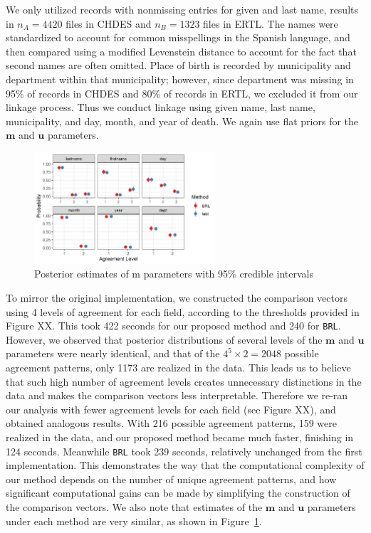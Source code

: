 \documentclass[12pt,letterpaper]{article}
\newcommand{\1}[1]{\mathbb{I}\!\left[#1\right]} %
\begin{document}
We only utilized records with nonmissing entries for given and last
name, results in \(n_A = 4420\) files in CHDES and \(n_B = 1323\) files
in ERTL. The names were standardized to account for common misspellings
in the Spanish language, and then compared using a modified Levenstein
distance to account for the fact that second names are often omitted.
Place of birth is recorded by municipality and department within that
municipality; however, since department was missing in 95\% of records
in CHDES and 80\% of records in ERTL, we excluded it from our linkage
process. Thus we conduct linkage using given name, last name,
municipality, and day, month, and year of death. We again use flat
priors for the \(\mathbf{m}\) and \(\mathbf{u}\) parameters.

\begin{figure}[t]
	
	{\centering \includegraphics[width=0.6\textwidth]{../notes/figures/el_salvador/m_posterior_smallP} 
		
	}
	
	\caption{Posterior estimates of m parameters with 95\% credible intervals}\label{fig:m-and-u}
\end{figure}

To mirror the original implementation, we constructed the comparison
vectors using 4 levels of agreement for each field, according to the
thresholds provided in Figure XX. This took 422 seconds for our proposed
method and 240 for \texttt{BRL}. However, we observed that posterior
distributions of several levels of the \(\mathbf{m}\) and \(\mathbf{u}\)
parameters were nearly identical, and that of the
\(4^5 \times 2 = 2048\) possible agreement patterns, only 1173 are
realized in the data. This leads us to believe that such high number of
agreement levels creates unnecessary distinctions in the data and makes
the comparison vectors less interpretable. Therefore we re-ran our
analysis with fewer agreement levels for each field (see Figure XX), and
obtained analogous results. With 216 possible agreement patterns, 159
were realized in the data, and our proposed method became much faster,
finishing in 124 seconds. Meanwhile \texttt{BRL} took 239 seconds,
relatively unchanged from the first implementation. This demonstrates
the way that the computational complexity of our method depends on the
number of unique agreement patterns, and how significant computational
gains can be made by simplifying the construction of the comparison
vectors. We also note that estimates of the \(\mathbf{m}\) and
\(\mathbf{u}\) parameters under each method are very similar, as shown in
Figure~\ref{fig:m-and-u}.
\end{document}
